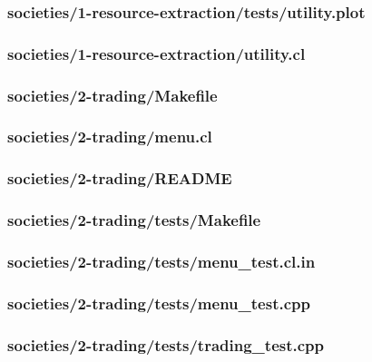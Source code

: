 \documentclass{article}
\begin{document}
\subsubsection*{societies/1-resource-extraction/tests/utility.plot}


\subsubsection*{societies/1-resource-extraction/utility.cl}


\subsubsection*{societies/2-trading/Makefile}


\subsubsection*{societies/2-trading/menu.cl}


\subsubsection*{societies/2-trading/README}


\subsubsection*{societies/2-trading/tests/Makefile}


\subsubsection*{societies/2-trading/tests/menu\_test.cl.in}


\subsubsection*{societies/2-trading/tests/menu\_test.cpp}


\subsubsection*{societies/2-trading/tests/trading\_test.cpp}

\end{document}
